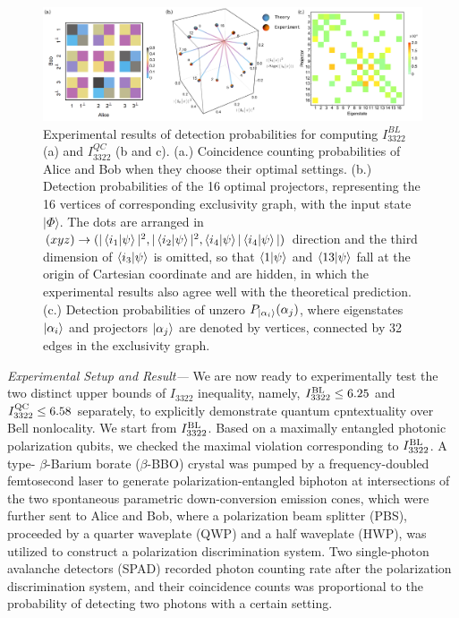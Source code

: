 \documentclass[prl,letterpaper,english,reprint,nofootinbib,aps,superscriptaddress,showpacs,showkeys]{revtex4-1}
\theoremstyle{definition}
\theoremstyle{remark}
\newcommand{\rom}[1]{\MakeUppercase{\romannumeral #1}}
\begin{document}
 
  \begin{figure}[htbp]
     \centering
     \includegraphics[width = .97 \textwidth]{fig/exp-res-all.pdf}
     \caption{Experimental results of detection probabilities for computing $I_{3322}^{BL}$ (a) and $I_{3322}^{QC}$ (b and c).
     (a.) Coincidence counting probabilities of Alice and Bob when they choose their optimal settings.
     (b.) Detection probabilities of the 16 optimal projectors, representing the 16 vertices of corresponding exclusivity graph, with the input state $|\Phi\rangle$.
     The dots are arranged in $(xyz)\to(|\braket{i_1|\psi}|^2, |\braket{i_2|\psi}|^2, \braket{i_4|\psi}|\braket{i_4|\psi}|)$ direction and the third dimension of $\braket{i_3|\psi}$ is omitted, so that $\braket{1|\psi}$ and $\braket{13|\psi}$ fall at the origin of Cartesian coordinate and are hidden, in which the experimental results also agree well with the theoretical prediction.
     (c.) Detection probabilities of unzero $P_{\ket{\alpha_i}}(\alpha_j)$, where eigenstates $\ket{\alpha_i}$ and projectors  $\ket{\alpha_j}$ are denoted by vertices, connected by 32 edges in the exclusivity graph.
     }
     \label{fig:exp-res-all}
 \end{figure}

 \emph{Experimental Setup and Result---} 
 We are now ready to experimentally test the two distinct upper bounds of $I_{3322}$ inequality, namely, $I_{3322}^{\rm BL}\leq6.25$ and $I_{3322}^{\rm QC}\leq6.58$ separately, to explicitly demonstrate quantum cpntextuality over Bell nonlocality. We start from $I_{3322}^{\rm BL}$. Based on a maximally entangled photonic polarization qubits, we checked the maximal violation corresponding to $I_{3322}^{\rm BL}$.
 A type-\rom{2} $\beta$-Barium borate ($\beta$-BBO) crystal was pumped by a frequency-doubled femtosecond laser to generate  polarization-entangled biphoton at intersections of the two spontaneous parametric down-conversion emission cones, which were further sent to Alice and Bob, where a polarization beam splitter (PBS), proceeded by a quarter waveplate (QWP) and a half waveplate (HWP), was utilized to construct a polarization discrimination system.
 Two single-photon avalanche detectors (SPAD) recorded photon counting rate after the polarization discrimination system, and their coincidence counts was proportional to the probability of detecting two photons with a certain setting.
 
\end{document}
